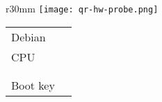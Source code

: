 \documentclass{article}
\begin{document}


\begin{wrapfigure}{r}{30mm}
	  \texttt{[image: qr-hw-probe.png]}
\end{wrapfigure}

\begin{tabular}{ l l }
	Debian & \debianversion \\
	CPU & \cpumodel \\
	\disktype & \disksize \\
	\memtype & \memsize \\
	Boot key & \bootmenukey \\
\end{tabular}  
\end{document}
